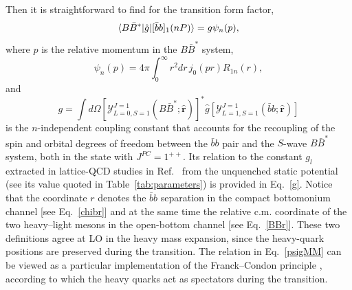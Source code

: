 \documentclass[aps,prd,showpacs,amsmath,twocolumn,superscriptaddress,floatfix,nofootinbib,notitlepage]{revtex4-2}
\newcommand{\bbnP}{[\bar{b}b]_1(nP)}
\newcommand{\ver}{{\bm r}}
\newcommand{\be}{\begin{equation}}
\newcommand{\ee}{\end{equation}}
\begin{document}
Then it is straightforward to find for the transition form factor,
\be
\braket{B\bar{B}^*|\hat{g}|\bbnP}=g\psi_n(p),
\label{psigMM}
\ee
where $p$ is the relative momentum in the $B\bar{B}^*$ system,
\be
\psi_n(p)=
4\pi \int_0^\infty r^2dr\, j_0(pr)R_{1n}(r),
\label{psinp}
\ee
and
\be
g=\int d\Omega \left[\mathcal{Y}_{L=0,S=1}^{J=1}(B\bar{B}^*;\hat{\ver})\right]^*\hat{g}\left[\mathcal{Y}_{L=1,S=1}^{J=1}(\bar{b}b;\hat{\ver})\right]
\label{gcoupling}
\ee
is the $n$-independent coupling constant that accounts for the recoupling of the spin and orbital degrees of freedom between the $\bar{b}b$ pair and the $S$-wave $B\bar{B}^*$ system, both in the state with $J^{PC}=1^{++}$. Its relation to the constant $g_l$ extracted in lattice-QCD studies in Ref.~\cite{Bulava:2024jpj} from the unquenched static potential (see its value quoted in Table~\ref{tab:parameters}) is provided in Eq.~\eqref{g}. Notice that the coordinate $r$ 
denotes the $\bar{b}b$ separation in the compact bottomonium channel [see Eq.~\eqref{chibr}] and at the same time the relative c.m. coordinate of the two heavy--light mesons in the open-bottom channel [see Eq.~\eqref{BBr}].
These two definitions agree at LO in the heavy mass expansion, since the heavy-quark positions are preserved during the transition. 
The relation in Eq.~\eqref{psigMM} can be viewed as a particular implementation of the Franck--Condon principle \cite{Franck:1926,Condon:1926,LlanesEstrada:2008fc,TorresRincon:2010fc}, according to which the heavy quarks act as spectators during the transition.
\end{document}
